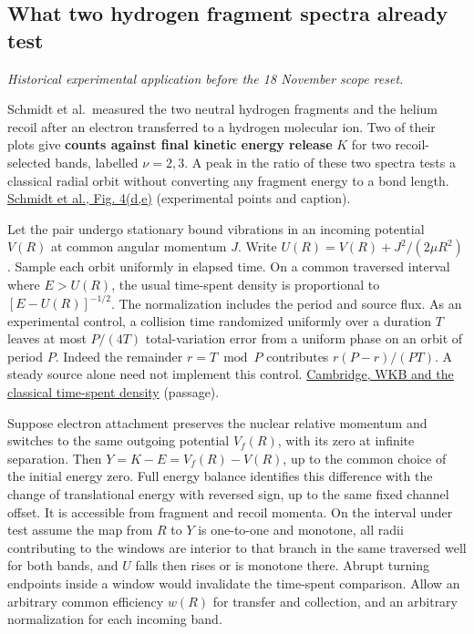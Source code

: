 \documentclass[11pt,a4paper]{article}
\begin{document}
\subsection{What two hydrogen fragment spectra already
test}\label{what-two-hydrogen-fragment-spectra-already-test}

\emph{Historical experimental application before the 18 November scope
reset.}

Schmidt et al.~measured the two neutral hydrogen fragments and the
helium recoil after an electron transferred to a hydrogen molecular ion.
Two of their plots give \textbf{counts against final kinetic energy
release} \(K\) for two recoil-selected bands, labelled \(\nu=2,3\). A
peak in the ratio of these two spectra tests a classical radial orbit
without converting any fragment energy to a bond length.
\href{https://arxiv.org/pdf/1202.3899\#page=5}{Schmidt et al., Fig.
4(d,e)} (experimental points and caption).

Let the pair undergo stationary bound vibrations in an incoming
potential \(V(R)\) at common angular momentum \(J\). Write
\(U(R)=V(R)+J^2/(2\mu R^2)\). Sample each orbit uniformly in elapsed
time. On a common traversed interval where \(E>U(R)\), the usual
time-spent density is proportional to \([E-U(R)]^{-1/2}\). The
normalization includes the period and source flux. As an experimental
control, a collision time randomized uniformly over a duration \(T\)
leaves at most \(P/(4T)\) total-variation error from a uniform phase on
an orbit of period \(P\). Indeed the remainder \(r=T\bmod P\)
contributes \(r(P-r)/(PT)\). A steady source alone need not implement
this control.
\href{https://www.tcm.phy.cam.ac.uk/~bds10/aqp/handout_approx.pdf}{Cambridge,
WKB and the classical time-spent density} (passage).

Suppose electron attachment preserves the nuclear relative momentum and
switches to the same outgoing potential \(V_f(R)\), with its zero at
infinite separation. Then \(Y=K-E=V_f(R)-V(R)\), up to the common choice
of the initial energy zero. Full energy balance identifies this
difference with the change of translational energy with reversed sign,
up to the same fixed channel offset. It is accessible from fragment and
recoil momenta. On the interval under test assume the map from \(R\) to
\(Y\) is one-to-one and monotone, all radii contributing to the windows
are interior to that branch in the same traversed well for both bands,
and \(U\) falls then rises or is monotone there. Abrupt turning
endpoints inside a window would invalidate the time-spent comparison.
Allow an arbitrary common efficiency \(w(R)\) for transfer and
collection, and an arbitrary normalization for each incoming band.
\end{document}
